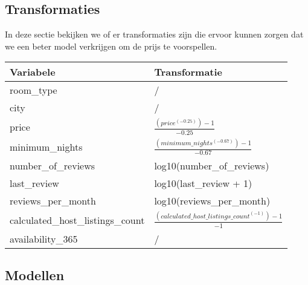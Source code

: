 \documentclass[a4paper,kulak]{kulakarticle} %
\begin{document}
\subsection{Transformaties}
In deze sectie bekijken we of er transformaties zijn die ervoor kunnen zorgen dat we een beter model verkrijgen om de prijs te voorspellen. 
\begin{tabular}{|l|l|}
	\hline 
	\textbf{Variabele} & \textbf{Transformatie} \\ 
	\hline 
	room\_type & / \\ 
	\hline 
	city & / \\ 
	\hline 
	price & $\frac{(price^{(-0.25)}) - 1}{-0.25}$ \\ 
	\hline 
	minimum\_nights & $\frac{(minimum\_nights^{(-0.67)}) - 1}{-0.67}$ \\ 
	\hline 
	number\_of\_reviews &  log10(number\_of\_reviews)\\ 
	\hline 
	last\_review & log10(last\_review + 1)\\
	\hline
	reviews\_per\_month &log10(reviews\_per\_month) \\
	\hline
	calculated\_host\_listings\_count & $\frac{(calculated\_host\_listings\_count^{(-1)}) - 1}{-1}$\\
	\hline
	availability\_365 & /\\ \hline
\end{tabular} 
\subsection{Modellen}
\end{document}
